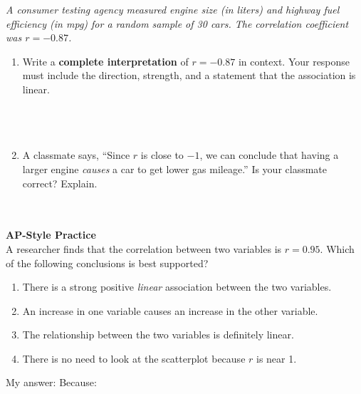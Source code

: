 \documentclass[10pt]{article}
\begin{document}
\namedateperiod

\vspace{0.18in}

\begin{tcolorbox}[colback=sky, colframe=navy, boxrule=0.9pt, arc=2mm,
    left=4mm, right=4mm, top=3mm, bottom=3mm]
\small\textit{A consumer testing agency measured engine size (in liters) and highway fuel
efficiency (in mpg) for a random sample of 30 cars. The correlation coefficient was
$r = -0.87$.}
\end{tcolorbox}

\vspace{0.2in}

\begin{enumerate}[leftmargin=1.6em, itemsep=0.22in]

  \item Write a \textbf{complete interpretation} of $r = -0.87$ in context. Your response
        must include the direction, strength, and a statement that the association is linear.\\[10pt]
        \writeline\\[3pt]\writeline\\[3pt]\writeline\\[3pt]\writeline

  \item A classmate says, ``Since $r$ is close to $-1$, we can conclude that having a
        larger engine \emph{causes} a car to get lower gas mileage.'' Is your classmate
        correct? Explain.\\[10pt]
        \writeline\\[3pt]\writeline\\[3pt]\writeline

\end{enumerate}

\vspace{0.14in}

\begin{tcolorbox}[colback=redbg, colframe=redacc, boxrule=0.8pt, arc=2mm,
    left=4mm, right=4mm, top=3mm, bottom=3mm]
\small\textbf{AP-Style Practice}\\[6pt]
A researcher finds that the correlation between two variables is $r = 0.95$. Which of the
following conclusions is best supported?

\vspace{10pt}
\begin{enumerate}[label=\textbf{(\Alph*)}, leftmargin=2em, itemsep=6pt]
  \item There is a strong positive \emph{linear} association between the two variables.
  \item An increase in one variable causes an increase in the other variable.
  \item The relationship between the two variables is definitely linear.
  \item There is no need to look at the scatterplot because $r$ is near 1.
\end{enumerate}
\end{tcolorbox}

\vspace{0.1in}
\noindent\textcolor{slate}{\small My answer: \blank{1cm} \quad Because: \blank{8.5cm}}
\end{document}

